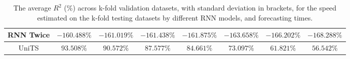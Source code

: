 \begin{table}[!ht]
{\begin{tabular}{|c|c|c|c|c|c|c|c|}
			RNN Twice & $-160.488\%$ & $-161.019\%$ & $-161.438\%$ & $-161.875\%$ & $-163.658\%$ & $-166.202\%$ & $-168.288\%$ \\ \hline
			UniTS & $93.508\%$ & $\mathbf{90.572\%}$ & $\mathbf{87.577\%}$ & $\mathbf{84.661\%}$ & $\mathbf{73.097\%}$ & $\mathbf{61.821\%}$ & $\mathbf{56.542\%}$ \\ \hline
		\end{tabular}
	}
	\caption{The average $R^{2}$ (\%) across k-fold validation datasets, with standard deviation in brackets, for the speed estimated on the k-fold testing datasets by different RNN models, and forecasting times.}
	\label{tab:all_speed_R2}
\end{table}
